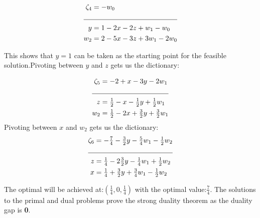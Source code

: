 \documentclass[letterpaper,12pt]{article}
\theoremstyle{definition}
\begin{document}
\begin{align*}
\zeta_4 & =-w_0\\
\cline{1-2}
y & =1-2x-2z+w_1-w_0\\
w_2 & =2-5x-3z+3w_1-2w_0\\
\end{align*}
\begin{flushleft}
This shows that $y=1$ can be taken as the starting point for the feasible solution.Pivoting between $y$ and $z$ gets us the dictionary:
\end{flushleft}

\begin{align*}
\zeta_5 & =-2+x-3y-2w_1\\
\cline{1-2}
z &=\tfrac{1}{2}-x-\tfrac{1}{2}y+\tfrac{1}{2}w_1\\
w_2 &=\tfrac{1}{2}-2x+\tfrac{3}{2}y+\tfrac{3}{2}w_1\\
\end{align*}
Pivoting between $x$ and $w_2$ gets us the dictionary:  
\begin{align*}
\zeta_6 &=-\tfrac{7}{4}-\tfrac{3}{2}y-\tfrac{5}{4}w_1-\tfrac{1}{2}w_2\\
\cline{1-2}
z &=\tfrac{1}{4}-2\tfrac{3}{2}y-\tfrac{1}{4}w_1+\tfrac{1}{2}w_2\\
x &=\tfrac{1}{4}+\tfrac{3}{2}y+\tfrac{3}{4}w_1-\tfrac{1}{2}w_2\\    
\end{align*}

\begin{flushleft}
The optimal will be achieved at:$(\frac{1}{4},0,\frac{1}{4})$ with the optimal value:$\frac{7}{4}$. The solutions to the primal and dual problems prove the strong duality theorem as the duality gap is \textbf{0}.
\end{flushleft}
 
\end{document}
